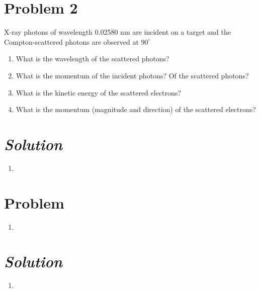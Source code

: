 \documentclass{article}
\begin{document}
\section*{Problem 2} 
X-ray photons of wavelength 0.02580 nm are incident on a target and the Compton-scattered photons are observed at $90^{\circ}$
\begin{enumerate}[label=\alph*)]
	\item %
	What is the wavelength of the scattered photons?
	\item %
	What is the momentum of the incident photons? Of the scattered photons?
	\item %
	What is the kinetic energy of the scattered electrons?
	\item %
	What is the momentum (magnitude and direction) of the scattered electrons?
\end{enumerate}
\section*{\textit{Solution}} 
\begin{enumerate}[label=\alph*)]
	\item %
\end{enumerate}

\section*{Problem } 
\begin{enumerate}[label=\alph*)]
	\item %
\end{enumerate}
\section*{\textit{Solution}} 
\begin{enumerate}[label=\alph*)]
	\item %
\end{enumerate}
\end{document}
